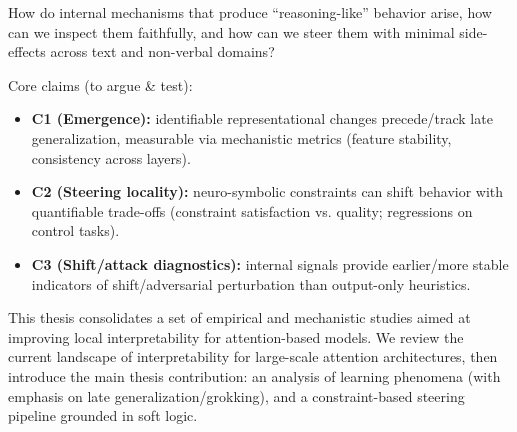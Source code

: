 \documentclass[../infufrgs/ppgc-tese.tex]{subfiles}
\begin{document}
How do internal mechanisms that produce “reasoning-like” behavior arise, how can we inspect them faithfully, and how can we steer them with minimal side-effects across text and non-verbal domains?

Core claims (to argue \& test):

\begin{itemize}
    \item \textbf{C1 (Emergence):} identifiable representational changes precede/track late generalization, measurable via mechanistic metrics (feature stability, consistency across layers).
    \item \textbf{C2 (Steering locality):} neuro-symbolic constraints can shift behavior with quantifiable trade-offs (constraint satisfaction vs. quality; regressions on control tasks).
    \item \textbf{C3 (Shift/attack diagnostics):} internal signals provide earlier/more stable indicators of shift/adversarial perturbation than output-only heuristics.
\end{itemize}



This thesis consolidates a set of empirical and mechanistic studies aimed at improving local interpretability for attention-based models. We review the current landscape of interpretability for large-scale attention architectures, then introduce the main thesis contribution: an analysis of learning phenomena (with emphasis on late generalization/grokking), and a constraint-based steering pipeline grounded in soft logic.
\end{document}
